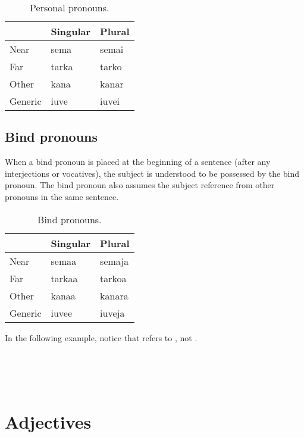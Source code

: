 \documentclass{book}
\begin{document}
\begin{table}[h]
    \caption{Personal pronouns.}
    \centering
    \begin{tabular}{|l|l|l|}
        \hline
        & Singular & Plural \\
        \hline
        Near & sema & semai \\
        Far & tarka & tarko \\
        Other & kana & kanar \\
        Generic & iuve & iuvei \\
        \hline
    \end{tabular}
\end{table}

\subsection{Bind pronouns}

When a bind pronoun is placed at the beginning of a sentence (after any interjections or vocatives), the subject is understood to be possessed by the bind pronoun. The bind pronoun also assumes the subject reference from other pronouns in the same sentence.

\begin{table}[h]
    \caption{Bind pronouns.}
    \centering
    \begin{tabular}{|l|l|l|}
        \hline
        & Singular & Plural \\
        \hline
        Near & semaa & semaja \\
        Far & tarkaa & tarkoa \\
        Other & kanaa & kanara \\
        Generic & iuvee & iuveja \\
        \hline
    \end{tabular}
\end{table}

In the following example, notice that  refers to , not .

~ \\
     \\
     \\
\emph{    }

\section{Adjectives}
\end{document}
